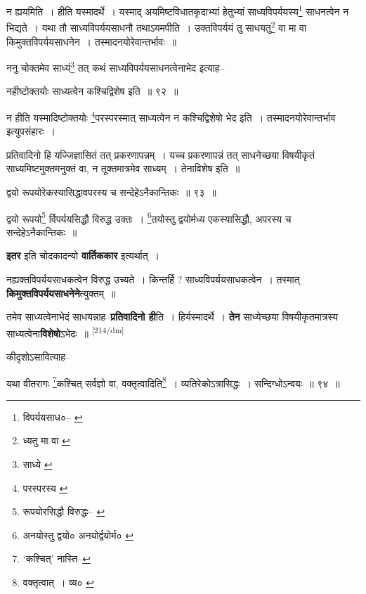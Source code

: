 \documentclass[article,12pt,a4paper]{memoir}
\begin{document}
	  \pstart न ह्ययमिति । हीति यस्मादर्थे । यस्माद् अयमिष्टविधातकृदाभ्यां हेतुभ्यां साध्यविपर्ययस्य\footnote{विपर्ययसाध०--\cite{dp-msA} \cite{dp-msB} \cite{dp-edP} \cite{dp-edH} \cite{dp-edE} \cite{dp-edN}} साधनत्वेन न भिद्यते । यथा तौ साध्यविपर्ययसाधनौ तथाऽयमपीति । उक्तविपर्ययं तु साधयतु\footnote{ध्यतु मा वा \cite{dp-edE} \cite{dp-msD}} वा मा वा किमुक्तविपर्ययसाधनेन । तस्मादनयोरेवान्तर्भावः ॥
	\pend
       

	  \pstart ननु चोक्तमेव साध्यं\footnote{साध्ये \cite{dp-msA} \cite{dp-msB} \cite{dp-edP} \cite{dp-edH} \cite{dp-edN}} तत् कथं साध्यविपर्ययसाधनत्वेनाभेद इत्याह--
	\pend
       

	  \pstart नहीष्टोक्तयोः साध्यत्वेन कश्चिद्विशेष इति ॥ ९२ ॥
	\pend
       

	  \pstart न हीति यस्मादिष्टोक्तयोः \footnote{परस्परस्य \cite{dp-msD} \cite{dp-msB} \cite{dp-edP} \cite{dp-edH} \cite{dp-edE}}परस्परस्मात् साध्यत्वेन न कश्चिद्विशेषो भेद इति । तस्मादनयोरेवान्तर्भाव इत्युपसंहारः ।
	\pend
       

	  \pstart प्रतिवादिनो हि यज्जिज्ञासितं तत् प्रकरणापन्नम् । यच्च प्रकरणापन्नं तत् साधनेच्छया विषयीकृतं साध्यमिष्टमुक्तमनुक्तं वा, न तूक्तमात्रमेव साध्यम् । तेनाविशेष इति ॥
	\pend
       

	  \pstart द्वयो रूपयोरेकस्यासिद्धावपरस्य च सन्देहेऽनैकान्तिकः ॥ ९३ ॥
	\pend
       

	  \pstart द्वयो रूपयो\footnote{रूपयोरसिद्धौ विरुद्धः--\cite{dp-msA} \cite{dp-msB} \cite{dp-msC} \cite{dp-msD} \cite{dp-edP} \cite{dp-edH} \cite{dp-edN}} र्विपर्ययसिद्धौ विरुद्ध उक्तः । \footnote{अनयोस्तु द्वयो० \cite{dp-msD} अनयोर्द्वयोर्म० \cite{dp-msA} \cite{dp-msB} \cite{dp-edP} \cite{dp-edH} \cite{dp-edE} \cite{dp-edN}}तयोस्तु द्वयोर्मध्य एकस्यासिद्धौ, अपरस्य च सन्देहेऽनैकान्तिकः ॥
	\pend
      

	  \pstart \textbf{इतर} इति चोदकादन्यो \textbf{वार्तिककार} इत्यर्थात् ।
	\pend
      

	  \pstart नह्यक्तविपर्ययसाधकत्वेन विरुद्ध उच्यते । किन्तर्हि ? साध्यविपर्ययसाधकत्वेन । तस्मात् \textbf{किमुक्तविपर्ययसाधनेने}त्युक्तम् ॥
	\pend
      

	  \pstart तमेव साध्यत्वेनाभेदं साधयन्नाह--\textbf{प्रतिवादिनो ही}ति । हिर्यस्मादर्थे । \textbf{तेन} साध्येच्छया विषयीकृतमात्रस्य साध्यत्वेना\textbf{विशेषो}ऽभेदः ॥
	\pend
      \leavevmode\textsuperscript{\rmlatinfont\tiny [214/dm]}

	  \pstart कीदृशोऽसावित्याह--
	\pend
       

	  \pstart यथा वीतरागः \footnote{‘कश्चित्’ नास्ति--\cite{dp-msC}}कश्चित् सर्वज्ञो वा, वक्तृत्वादिति\footnote{वक्तृत्वात् । व्य० \cite{dp-msC}} । व्यतिरेकोऽत्रासिद्धः । सन्दिग्धोऽन्वयः ॥ ९४ ॥
	\pend
       
\end{document}
